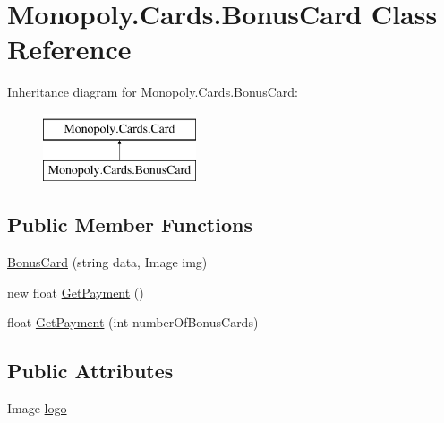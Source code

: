 \hypertarget{class_monopoly_1_1_cards_1_1_bonus_card}{}\section{Monopoly.\+Cards.\+Bonus\+Card Class Reference}
\label{class_monopoly_1_1_cards_1_1_bonus_card}
Inheritance diagram for Monopoly.\+Cards.\+Bonus\+Card\+:\begin{figure}[H]
\begin{center}
\leavevmode
\includegraphics[height=2.000000cm]{class_monopoly_1_1_cards_1_1_bonus_card}
\end{center}
\end{figure}
\subsection*{Public Member Functions}
\begin{DoxyCompactItemize}
\item 
\mbox{\hyperlink{class_monopoly_1_1_cards_1_1_bonus_card_a444094e643634f0c671c43917f44412f}{Bonus\+Card}} (string data, Image img)
\item 
new float \mbox{\hyperlink{class_monopoly_1_1_cards_1_1_bonus_card_af017cfbb4591f7afeca653b87aae9bb1}{Get\+Payment}} ()
\item 
float \mbox{\hyperlink{class_monopoly_1_1_cards_1_1_bonus_card_a588a1016314ff62faab1fb693b340bfe}{Get\+Payment}} (int number\+Of\+Bonus\+Cards)
\end{DoxyCompactItemize}
\subsection*{Public Attributes}
\begin{DoxyCompactItemize}
\item 
Image \mbox{\hyperlink{class_monopoly_1_1_cards_1_1_card_a84da6fc446a55518f9bdf8fa7eef9057}{logo}}
\end{DoxyCompactItemize}
